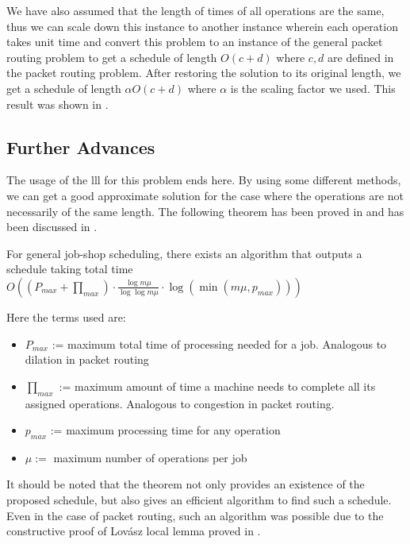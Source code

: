 We have also assumed that the length of times of all operations are the same, thus we can scale down this instance to another instance wherein each operation takes unit time and convert this problem to an instance of the general packet routing problem to get a schedule of length $O(c+d)$ where $c,d$ are defined in the packet routing problem. After restoring the solution to its original length, we get a schedule of length $\alpha O(c+d)$ where $\alpha$ is the scaling factor we used. This result was shown in \cite{jobshop}.

\subsection{Further Advances}
The usage of the lll for this problem ends here. By using some different methods, we can get a good approximate solution for the case where the operations are not necessarily of the same length. The following theorem has been proved in \cite{shopadvance} and has been discussed in \cite{srinivasan}.
\begin{theorem}
 For general job-shop scheduling, there exists an algorithm that outputs a schedule taking total time $O((P_{max}+\prod_{max})\cdot \frac{\log m\mu}{\log\log m\mu}\cdot\log(\min(m\mu,p_{max})) ) $
\end{theorem}
Here the terms used are:
\begin{itemize}
 \item $P_{max}$ := maximum total time of processing needed for a job. Analogous to dilation in packet routing
 \item $\prod_{max}$ := maximum amount of time a machine needs to complete all its assigned operations. Analogous to congestion in packet routing.
 \item $p_{max}$ := maximum processing time for any operation
 \item $\mu := $ maximum number of operations per job
\end{itemize}
It should be noted that the theorem not only provides an existence of the proposed schedule, but also gives an efficient algorithm to find such a schedule. Even in the case of packet routing, such an algorithm was possible due to the constructive proof of Lov\'asz local lemma proved in \cite{constructive}.


